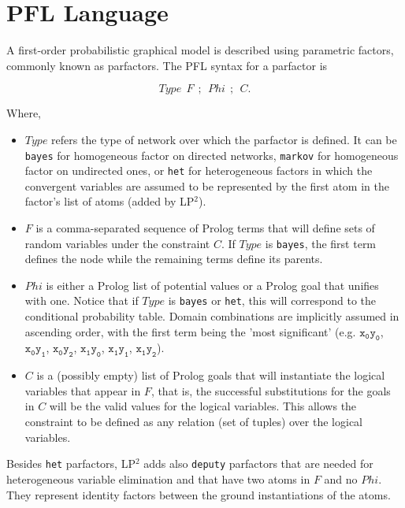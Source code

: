 \documentclass{article}
\begin{document}
\section{PFL Language}
A first-order probabilistic graphical model is described using parametric factors, commonly known as parfactors. The PFL syntax for a parfactor is

$$Type~~F~~;~~Phi~~;~~C.$$

Where,
\begin{itemize}
\item $Type$ refers the type of network over which the parfactor is defined. It can be \texttt{bayes} for homogeneous factor on directed networks, \texttt{markov} for homogeneous factor on undirected ones, or \texttt{het} for heterogeneous factors 
in which the convergent variables are assumed to be represented by the first atom in the factor’s list of atoms (added by LP$^2$).

\item $F$ is a comma-separated sequence of Prolog terms that will define sets of random variables under the constraint $C$. If $Type$ is \texttt{bayes}, the first term defines the node while the remaining terms define its parents.

\item $Phi$ is either a Prolog list of potential values or a Prolog goal that unifies with one. Notice that if $Type$ is \texttt{bayes} or \texttt{het}, this will correspond to the conditional probability table. Domain combinations are implicitly assumed in ascending order, with the first term being the 'most significant' (e.g. $\mathtt{x_0y_0}$, $\mathtt{x_0y_1}$, $\mathtt{x_0y_2}$, $\mathtt{x_1y_0}$, $\mathtt{x_1y_1}$, $\mathtt{x_1y_2}$).

\item $C$ is a (possibly empty) list of Prolog goals that will instantiate the logical variables that appear in $F$, that is, the successful substitutions for the goals in $C$ will be the valid values for the logical variables. This allows the constraint to be defined as any relation (set of tuples) over the logical variables.
\end{itemize}

Besides \texttt{het} parfactors, LP$^2$ adds also \texttt{deputy} parfactors that are needed for heterogeneous variable elimination and that have two atoms in 
$F$ and no $Phi$.
They represent identity factors between the ground instantiations of the atoms.


\end{document}
